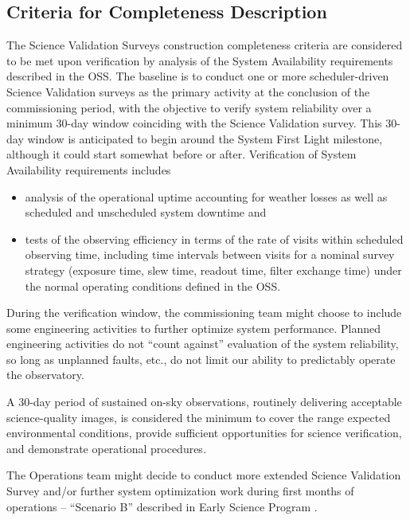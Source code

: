 \subsection{Criteria for Completeness Description}

The Science Validation Surveys construction completeness criteria are considered to be met upon verification by analysis of the System Availability requirements described in the OSS.
The baseline is to conduct one or more scheduler-driven Science Validation surveys as the primary activity at the conclusion of the commissioning period, with the objective to verify system reliability over a minimum 30-day window coinciding with the Science Validation survey. This 30-day window is anticipated to begin around the System First Light milestone, although it could start somewhat before or after.
Verification of System Availability requirements includes

\begin{itemize}
        \item analysis of the operational uptime accounting for weather losses as well as scheduled and unscheduled system downtime and
        \item tests of the observing efficiency in terms of the rate of visits within scheduled observing time, including time intervals between visits for a nominal survey strategy (exposure time, slew time, readout time, filter exchange time) under the normal operating conditions defined in the OSS.
\end{itemize}

During the verification window, the commissioning team might choose to include some engineering activities to further optimize system performance. Planned engineering activities do not ``count against'' evaluation of the system reliability, so long as unplanned faults, etc., do not limit our ability to predictably operate the observatory.

A 30-day period of sustained on-sky observations, routinely delivering acceptable science-quality images, is considered the minimum to cover the range expected environmental conditions, provide sufficient opportunities for science verification, and demonstrate operational procedures.

The Operations team might decide to conduct more extended Science Validation Survey and/or further system optimization work during first months of operations – ``Scenario B'' described in Early Science Program .



